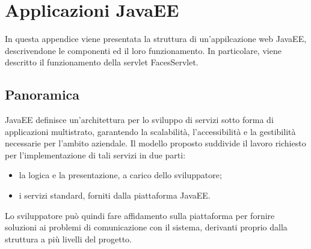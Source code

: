 \chapter{Applicazioni JavaEE}\label{app:javaee}
\begin{flushright}
	\parbox{13cm}{\small In questa appendice viene presentata la struttura di un'appilcazione web JavaEE, descrivendone le componenti ed il loro funzionamento. In particolare, viene descritto il funzionamento della servlet FacesServlet.}
\end{flushright}
\section{Panoramica}
JavaEE definisce un'architettura per lo sviluppo di servizi sotto forma di applicazioni multistrato, garantendo la scalabilità, l'accessibilità e la gestibilità necessarie per l'ambito aziendale. Il modello proposto suddivide il lavoro richiesto per l'implementazione di tali servizi in due parti:
\begin{itemize}
	\item la logica e la presentazione, a carico dello sviluppatore;
	\item i servizi standard, forniti dalla piattaforma JavaEE.
\end{itemize}
Lo sviluppatore può quindi fare affidamento sulla piattaforma per fornire soluzioni ai problemi di comunicazione con il sistema, derivanti proprio dalla struttura a più livelli del progetto.

